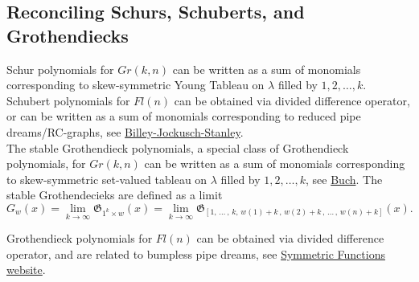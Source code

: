 \subsection{Reconciling Schurs, Schuberts, and Grothendiecks}

Schur polynomials for $Gr(k,n)$ can be written as a sum of monomials corresponding to skew-symmetric Young Tableau on $\lambda$ filled by $1, 2, \dots, k$. \\

Schubert polynomials for $Fl(n)$ can be obtained via divided difference operator, or can be written as a sum of monomials corresponding to reduced pipe dreams/RC-graphs, see \href{https://sites.math.washington.edu/~billey/papers/bjs.pdf}{Billey-Jockusch-Stanley}. \\

The stable Grothendieck polynomials, a special class of Grothendieck polynomials, for $Gr(k,n)$ can be written as a sum of monomials corresponding to skew-symmetric set-valued tableau on $\lambda$ filled by $1, 2, \dots, k$, see 
\href{https://sites.math.rutgers.edu/~asbuch/papers/combkth.pdf}{Buch}. The stable Grothendecieks are defined as a limit
\[ 
    G_w(x) = \lim\limits_{k \rightarrow \infty}\mathfrak{G}_{1^k \times w}(x) = \lim\limits_{k \rightarrow \infty}\mathfrak{G}_{[1, \, \dots \,, \, k, \, w(1) + k \,, \,w(2) + k \,, \, \dots \,, \,w(n)+ k]}(x).
\]

Grothendieck polynomials for $Fl(n)$ can be obtained via divided difference operator, and are related to bumpless pipe dreams, see \href{https://www.symmetricfunctions.com/grothendieck.htm}{Symmetric Functions website}.

